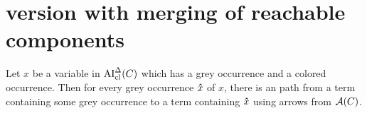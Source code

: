 \documentclass[,%
	paper=a4,%
	DIV11, %
	twoside=false,%
	liststotoc,
	bibtotoc,
	draft=false,%
	numbers=noendperiod
]{scrartcl}
\begin{document}
\newcommand{\substremarksym}{$\ast$}
\newcommand{\substremarkref}{$(\ast)$}

\newcommand{\lif}[1]{\lift{\Delta}{#1}{x}}
\newcommand{\newterm}{^*}
\newcommand{\de}{^\Delta}

\section{version with merging of reachable components}




\begin{clemma}
	Let $x$ be a variable in $\operatorname{AI}_\mathrm{cl}^\Delta(C)$ which has a grey occurrence and a colored occurrence.
	Then for every grey occurrence $\bm\hat x$ of $x$, there is an path from a term containing some grey occurrence to a term containing $\bm\hat x$ using arrows from $\operatorname{\mathcal{A}}(C)$.
\end{clemma}
\end{document}
